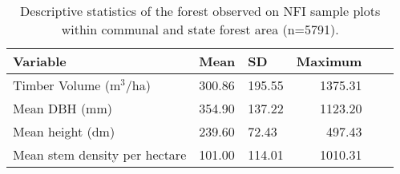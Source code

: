 
\begin{table}[ht]
	\centering
	\caption{Descriptive statistics of the forest observed on NFI sample plots within communal and state forest area (n=5791).}
	\label{tab:fieldata}
	\begin{tabular}{lllrrr}
		\hline
		Variable & Mean & SD & Maximum \\ 
		\hline
Timber Volume (m$^3$/ha) & 300.86 & 195.55 & 1375.31 \\
Mean DBH (mm) & 354.90 & 137.22 & 1123.20 \\
Mean height (dm) & 239.60 & 72.43 & 497.43 \\
Mean stem density per hectare & 101.00  & 114.01 & 1010.31 \\
\hline
\hline
\end{tabular}
\end{table}
